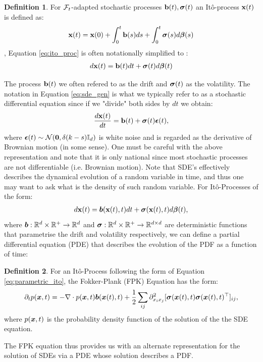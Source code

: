 \documentclass[a4paper,12pt,twoside,openright]{report}
\theoremstyle{definition}
\newtheorem{definition}{Definition}[section]
\begin{document}
\begin{definition}
    For ${\mathcal{F}}_t$-adapted stochastic processes ${\mathbf{b}}(t), {\bm{\sigma}}(t)$ an Itô-process ${\mathbf{x}}(t)$ is defined as:
    \begin{align}\label{eq:ito_proc}
    {\mathbf{x}}(t) = {\mathbf{x}}(0) + \int_{0}^t {\mathbf{b}}(s) ds + \int_0^t {\bm{\sigma}}(s) d{\bm{\beta}}(s)
    \end{align},
Equation \ref{eq:ito_proc} is often notationally simplified to :
    \begin{align}\label{eq:sde_gen}
        d{\mathbf{x}}(t) ={\mathbf{b}}(t) dt + {\bm{\sigma}}(t) d{\bm{\beta}}(t)
    \end{align}
\end{definition}
The process ${\mathbf{b}}(t)$ we often refered to as the drift and ${\bm{\sigma}}(t)$ as the volatility. The notation in Equation \ref{eq:sde_gen} is what we typically refer to as a stochastic differential equation since if we "divide" both sides by $dt$ we obtain:
\begin{align*}
    \frac{d {\mathbf{x}}(t)}{dt} = {\mathbf{b}}(t) + {\bm{\sigma}}(t) {\bm{\epsilon}}(t),
\end{align*}
where ${\bm{\epsilon}}(t) \sim {\mathcal{N}}({\bm{0}}, \delta(k-s){\mathbb{I}_d})$ is white noise and is regarded as the derivative of Brownian motion (in some sense). One must be careful with the above representation and note that it is only national since most stochastic processes are not differentiable (i.e. Brownian motion).
Note that SDE's effectively describes the dynamical evolution of a random variable in time, and thus one may want to ask what is the density of such random variable. For Itô-Processes of the form:
\begin{align}\label{eq:parametric_ito}
     d{\mathbf{x}}(t) ={\bm{b}}({\mathbf{x}}(t), t) dt + {\bm{\sigma}}({\mathbf{x}}(t), t) d{\bm{\beta}}(t),
\end{align}
where ${\bm{b}} : {\mathbb{R}}^d \times {\mathbb{R}}^{+} \rightarrow {\mathbb{R}}^d$ and ${\bm{\sigma}} : {\mathbb{R}}^d \times {\mathbb{R}}^{+} \rightarrow {\mathbb{R}}^{d\times d}$ are deterministic functions that parametrise the drift and volatility respectively, we can define a partial differential equation (PDE) that describes the evolution of the PDF as a function of time:
\begin{definition}\label{def:fpk}
    For an Itô-Process following the form of Equation \ref{eq:parametric_ito}, the Fokker-Plank (FPK) Equation has the form:
    \begin{align}\label{eq:fpk}
        \partial_{t} p({\bm{x}}, t) =-\nabla \cdot p({\bm{x}}, t){\bm{b}}({\bm{x}}(t), t) + \frac{1}{2} \sum_{ij} \partial^2_{{x_i}{x_j}}[{\bm{\sigma}}({\bm{x}}(t), t){\bm{\sigma}}({\bm{x}}(t), t)^{\top}]_{ij},
    \end{align}
    where $p({\bm{x}}, t)$ is the probability density function of the solution of the the SDE equation.
\end{definition}
The FPK equation thus provides us with an alternate representation for the solution of SDEs via a PDE whose solution describes a PDF.
\end{document}
